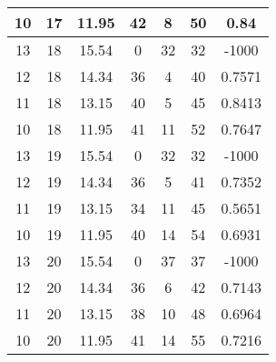 \documentclass[letterpaper, 12pt]{article}
\begin{document}
\begin{longtable}{|c|c|c|c|c|c|c|}
10 & 17 & 11.95 & 42 & 8 & 50 & 0.84 \\
\hline
13 & 18 & 15.54 & 0 & 32 & 32 & -1000 \\
\hline
12 & 18 & 14.34 & 36 & 4 & 40 & 0.7571 \\
\hline
11 & 18 & 13.15 & 40 & 5 & 45 & 0.8413 \\
\hline
10 & 18 & 11.95 & 41 & 11 & 52 & 0.7647 \\
\hline
13 & 19 & 15.54 & 0 & 32 & 32 & -1000 \\
\hline
12 & 19 & 14.34 & 36 & 5 & 41 & 0.7352 \\
\hline
11 & 19 & 13.15 & 34 & 11 & 45 & 0.5651 \\
\hline
10 & 19 & 11.95 & 40 & 14 & 54 & 0.6931 \\
\hline
13 & 20 & 15.54 & 0 & 37 & 37 & -1000 \\
\hline
12 & 20 & 14.34 & 36 & 6 & 42 & 0.7143 \\
\hline
11 & 20 & 13.15 & 38 & 10 & 48 & 0.6964 \\
\hline
10 & 20 & 11.95 & 41 & 14 & 55 & 0.7216 \\
\hline
\end{longtable}
\end{document}
